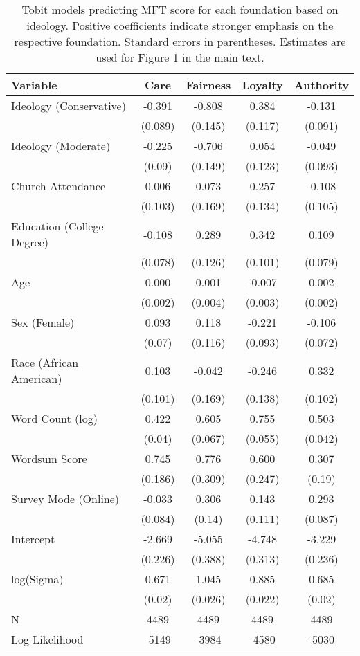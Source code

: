 \begin{table}[ht]
\centering
\caption{Tobit models predicting MFT score for each foundation based 
           on ideology. Positive coefficients indicate stronger emphasis on the respective 
           foundation. Standard errors in parentheses. Estimates are used for Figure 
           1 in the main text.} 
\label{tab:tobit_ideol}
\begingroup\footnotesize
\begin{tabular}{lcccc}
  \hline
Variable & Care & Fairness & Loyalty & Authority \\ 
  \hline
Ideology (Conservative) & -0.391 & -0.808 &  0.384 & -0.131 \\ 
   & (0.089) & (0.145) & (0.117) & (0.091) \\ 
  Ideology (Moderate) & -0.225 & -0.706 &  0.054 & -0.049 \\ 
   & (0.09) & (0.149) & (0.123) & (0.093) \\ 
  Church Attendance &  0.006 &  0.073 &  0.257 & -0.108 \\ 
   & (0.103) & (0.169) & (0.134) & (0.105) \\ 
  Education (College Degree) & -0.108 &  0.289 &  0.342 &  0.109 \\ 
   & (0.078) & (0.126) & (0.101) & (0.079) \\ 
  Age &  0.000 &  0.001 & -0.007 &  0.002 \\ 
   & (0.002) & (0.004) & (0.003) & (0.002) \\ 
  Sex (Female) &  0.093 &  0.118 & -0.221 & -0.106 \\ 
   & (0.07) & (0.116) & (0.093) & (0.072) \\ 
  Race (African American) &  0.103 & -0.042 & -0.246 &  0.332 \\ 
   & (0.101) & (0.169) & (0.138) & (0.102) \\ 
  Word Count (log) &  0.422 &  0.605 &  0.755 &  0.503 \\ 
   & (0.04) & (0.067) & (0.055) & (0.042) \\ 
  Wordsum Score &  0.745 &  0.776 &  0.600 &  0.307 \\ 
   & (0.186) & (0.309) & (0.247) & (0.19) \\ 
  Survey Mode (Online) & -0.033 &  0.306 &  0.143 &  0.293 \\ 
   & (0.084) & (0.14) & (0.111) & (0.087) \\ 
  Intercept & -2.669 & -5.055 & -4.748 & -3.229 \\ 
   & (0.226) & (0.388) & (0.313) & (0.236) \\ 
  log(Sigma) &  0.671 &  1.045 &  0.885 &  0.685 \\ 
   & (0.02) & (0.026) & (0.022) & (0.02) \\ 
   \hline
N & 4489 & 4489 & 4489 & 4489 \\ 
  Log-Likelihood & -5149 & -3984 & -4580 & -5030 \\ 
   \hline
\end{tabular}
\endgroup
\end{table}
